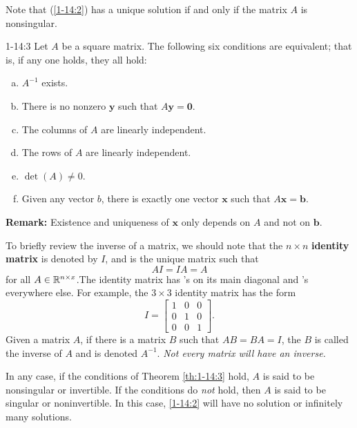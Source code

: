 \documentclass[letterpaper]{article}
\newcommand{\mb}{\mathbf{b}}
\newcommand{\mx}{\mathbf{x}}
\begin{document}
\bigskip 

Note that (\ref{1-14:2}) has a unique solution if and only if the matrix $A$ is nonsingular. 

\begin{theorem}{}{1-14:3}
    Let $A$ be a square matrix. The following six conditions are equivalent; that is, if any one holds, they all hold: 
    \begin{enumerate}[(a)]
        \item $A^{-1}$ exists. 
        \item There is no nonzero $\mathbf{y}$ such that $A\mathbf{y} = \mathbf{0}$.
        \item The columns of $A$ are linearly independent.
        \item The rows of $A$ are linearly independent. 
        \item $\det(A) \neq 0$.
        \item Given any vector $b$, there is exactly one vector $\mx$ such that $A\mx = \mb$. 
    \end{enumerate}
\end{theorem}
\textbf{Remark:} Existence and uniqueness of $\mx$ only depends on $A$ and not on $\mb$.

To briefly review the inverse of a matrix, we should note that the $n \times n$ \textbf{identity matrix} is denoted by $I$, and is the unique matrix such that 
\[AI = IA = A\]
for all $A \in \mathbb{R}^{n \times x}$.The identity matrix has 's on its main diagonal and 's everywhere else. For example, the $3 \times 3$ identity matrix has the form 
\[I = \begin{bmatrix}
    1 & 0 & 0 \\ 
    0 & 1 & 0 \\ 
    0 & 0 & 1
\end{bmatrix}.\]
Given a matrix $A$, if there is a matrix $B$ such that $AB = BA = I$, the $B$ is called the inverse of $A$ and is denoted $A^{-1}$. \emph{Not every matrix will have an inverse.}

\bigskip 

In any case, if the conditions of Theorem \ref{th:1-14:3} hold, $A$ is said to be nonsingular or invertible. If the conditions do \emph{not} hold, then $A$ is said to be singular or noninvertible. In this case, \ref{1-14:2} will have no solution or infinitely many solutions. 

\bigskip 
\end{document}
